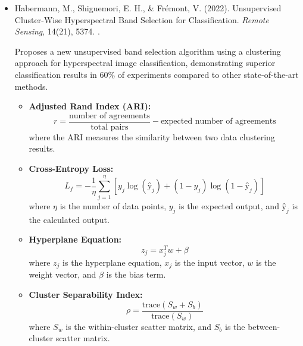 \documentclass[10pt,svgnames,fragile]{beamer}
\begin{document}
\begin{frame}{}
\tiny
\begin{itemize}

    \item Habermann, M., Shiguemori, E. H., \& Frémont, V. (2022). Unsupervised Cluster-Wise Hyperspectral Band Selection for Classification. \textit{Remote Sensing}, 14(21), 5374. \href{https://doi.org/10.3390/rs14215374}{\color{blue}{DOI: 10.3390/rs14215374}}. \cite{habermannUnsupervisedClusterWiseHyperspectral2022}
    
    {\color{gray}Proposes a new unsupervised band selection algorithm using a clustering approach for hyperspectral image classification, demonstrating superior classification results in 60\% of experiments compared to other state-of-the-art methods.}
    \begin{itemize} \tiny
    \item \textbf{Adjusted Rand Index (ARI):}
    \[
    r = \frac{\text{number of agreements}}{\text{total pairs}} - \text{expected number of agreements}
    \]
    where the ARI measures the similarity between two data clustering results.

    \item \textbf{Cross-Entropy Loss:}
    \[
    L_f = -\frac{1}{\eta} \sum_{j=1}^{\eta} [y_j \log(ŷ_j) + (1 - y_j) \log(1 - ŷ_j)]
    \]
    where \( \eta \) is the number of data points, \( y_j \) is the expected output, and \( ŷ_j \) is the calculated output.

    \item \textbf{Hyperplane Equation:}
    \[
    z_j = x_j^T w + \beta
    \]
    where \( z_j \) is the hyperplane equation, \( x_j \) is the input vector, \( w \) is the weight vector, and \( \beta \) is the bias term.

    \item \textbf{Cluster Separability Index:}
    \[
    \rho = \frac{\text{trace}(S_w + S_b)}{\text{trace}(S_w)}
    \]
    where \( S_w \) is the within-cluster scatter matrix, and \( S_b \) is the between-cluster scatter matrix.
    \end{itemize}
    
\end{itemize}
\end{frame}
\end{document}
